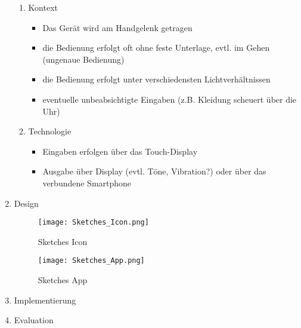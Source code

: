 \documentclass[a4paper,10pt]{article}
\begin{document}
\begin{enumerate}
\begin{enumerate}
\item Kontext

\begin{itemize}
\item Das Gerät wird am Handgelenk getragen
\item die Bedienung erfolgt oft ohne feste Unterlage, evtl. im Gehen (ungenaue Bedienung)
\item die Bedienung erfolgt unter verschiedensten Lichtverhältnissen
\item eventuelle unbeabsichtigte Eingaben (z.B. Kleidung scheuert über die Uhr)
\end{itemize}

\item Technologie

\begin{itemize}
\item Eingaben erfolgen über das Touch-Display
\item Ausgabe über Display (evtl. Töne, Vibration?) oder über das verbundene Smartphone
\end{itemize}

\end{enumerate}

\newpage
\item Design

\begin{figure}[H]
	\centering
	\texttt{[image: Sketches\_Icon.png]} 
	\caption{Sketches Icon}
	\label{fig1}
\end{figure}
\begin{figure}[H]
	\centering
	\texttt{[image: Sketches\_App.png]} 
	\caption{Sketches App}
	\label{fig2}
\end{figure}

\newpage
\item Implementierung



\newpage
\item Evaluation

\end{enumerate}
\end{document}
